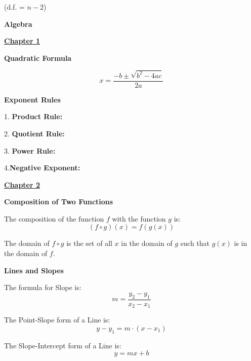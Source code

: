 \documentclass{article}
\begin{document}
\begin{large}
\hspace{0.2in} (d.f. = $n-2$)

\newpage

\chead{ }

\vspace*{\fill}

\begin{center}\textbf{\Huge{ Algebra }}\end{center}

\vspace*{\fill}

\newpage


\underline{\textbf{\huge Chapter 1 \phantom{ } \phantom{ } \phantom{ } \phantom{ }}}

\textbf{Quadratic Formula}

\[\displaystyle x = \dfrac{-b \pm \sqrt{b^{2} - 4ac}}{2a}\]

\textbf{Exponent Rules}

1. \textbf{Product Rule:} 

2. \textbf{Quotient Rule:} 

3. \textbf{Power Rule:} 

4.\textbf{Negative Exponent:} 

\vspace{0.1in}
\underline{\textbf{\huge Chapter 2 \phantom{ } \phantom{ } \phantom{ } \phantom{ }}}

\textbf{Composition of Two Functions}

The composition of the function $f$ with the function $g$ is: 
\[(f \circ g)(x) = f(g(x))\]

\vspace{-0.5cm}
The domain of $f \circ g$ is the set of all $x$ in the domain of $g$ such that $g(x)$ is in the domain of $f$.

\textbf{Lines and Slopes}

The formula for Slope is:
\[\displaystyle m = \frac{y_2 - y_1}{x_2 - x_1}\]

The Point-Slope form of a Line is:
\[\displaystyle y-y_1=m\cdot(x-x_1)\]

The Slope-Intercept form of a Line is:
\[\displaystyle y=mx+b\]


\end{large}
\end{document}
